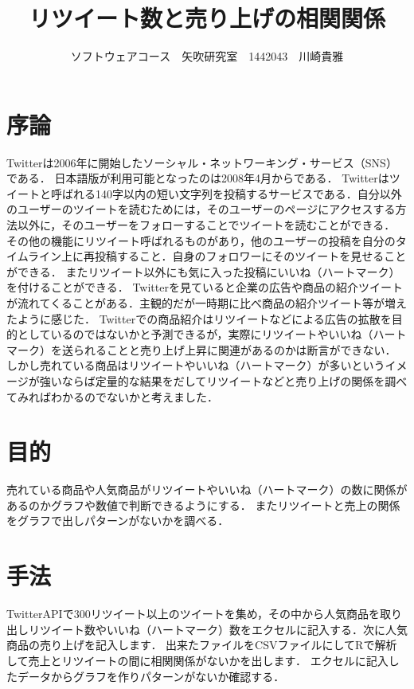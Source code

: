 \documentclass[uplatex,twocolumn,dvipdfmx]{jsarticle}
\title{\vspace{-5mm}\fontsize{14pt}{0pt}\selectfont リツイート数と売り上げの相関関係}
\author{\normalsize ソフトウェアコース　矢吹研究室　1442043　川崎貴雅}
\date{}
\begin{document}
\fontsize{10.5pt}{\baselineskip}\selectfont
\maketitle






\section{序論}
Twitterは2006年に開始したソーシャル・ネットワーキング・サービス（SNS）である．
日本語版が利用可能となったのは2008年4月からである．
Twitterはツイートと呼ばれる140字以内の短い文字列を投稿するサービスである．自分以外のユーザーのツイートを読むためには，そのユーザーのページにアクセスする方法以外に，そのユーザーをフォローすることでツイートを読むことができる．\nocite{bib002}
その他の機能にリツイート呼ばれるものがあり，他のユーザーの投稿を自分のタイムライン上に再投稿すること．自身のフォロワーにそのツイートを見せることができる．
またリツイート以外にも気に入った投稿にいいね（ハートマーク）を付けることができる．
Twitterを見ていると企業の広告や商品の紹介ツイートが流れてくることがある．主観的だが一時期に比べ商品の紹介ツイート等が増えたように感じた．
Twitterでの商品紹介はリツイートなどによる広告の拡散を目的としているのではないかと予測できるが，実際にリツイートやいいね（ハートマーク）を送られることと売り上げ上昇に関連があるのかは断言ができない．
しかし売れている商品はリツイートやいいね（ハートマーク）が多いというイメージが強いならば定量的な結果をだしてリツイートなどと売り上げの関係を調べてみればわかるのでないかと考えました．

\section{目的}

売れている商品や人気商品がリツイートやいいね（ハートマーク）の数に関係があるのかグラフや数値で判断できるようにする．
またリツイートと売上の関係をグラフで出しパターンがないかを調べる．

\section{手法}
TwitterAPIで300リツイート以上のツイートを集め，その中から人気商品を取り出しリツイート数やいいね（ハートマーク）数をエクセルに記入する．次に人気商品の売り上げを記入します．
出来たファイルをCSVファイルにしてRで解析して売上とリツイートの間に相関関係がないかを出します．
エクセルに記入したデータからグラフを作りパターンがないか確認する．
\end{document}
